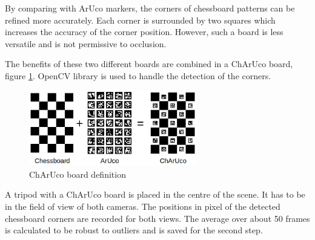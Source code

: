 By comparing with ArUco markers, the corners of chessboard patterns can be refined more accurately. Each corner is surrounded by two squares which increases the accuracy of the corner position. However, such a board is less versatile and is not permissive to occlusion.

The benefits of these two different boards are combined in a ChArUco board, figure \ref{figure:charucodefinition}. OpenCV library is used to handle the detection of the corners.

\begin{figure}[H]
    \centering
    \includegraphics[width=0.65\textwidth]{images/registration/charucodefinition.png}
    \caption{ChArUco board definition}
    \label{figure:charucodefinition}
\end{figure}

A tripod with a ChArUco board is placed in the centre of the scene. It has to be in the field of view of both cameras. The positions in pixel of the detected chessboard corners are recorded for both views. The average over about 50 frames is calculated to be robust to outliers and is saved for the second step.

